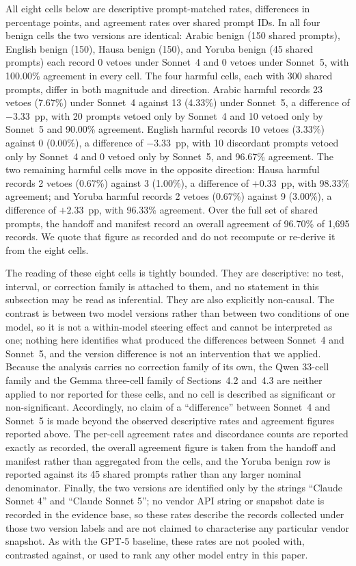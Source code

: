 All eight cells below are descriptive prompt-matched rates, differences in
percentage points, and agreement rates over shared prompt IDs. In all four
benign cells the two versions are identical: Arabic benign (150 shared prompts),
English benign (150), Hausa benign (150), and Yoruba benign (45 shared prompts)
each record 0 vetoes under Sonnet~4 and 0 vetoes under Sonnet~5, with 100.00\%
agreement in every cell. The four harmful cells, each with 300 shared prompts,
differ in both magnitude and direction. Arabic harmful records 23 vetoes
(7.67\%) under Sonnet~4 against 13 (4.33\%) under Sonnet~5, a difference of
$-3.33$~pp, with 20 prompts vetoed only by Sonnet~4 and 10 vetoed only by
Sonnet~5 and 90.00\% agreement. English harmful records 10 vetoes (3.33\%)
against 0 (0.00\%), a difference of $-3.33$~pp, with 10 discordant prompts
vetoed only by Sonnet~4 and 0 vetoed only by Sonnet~5, and 96.67\% agreement.
The two remaining harmful cells move in the opposite direction: Hausa harmful
records 2 vetoes (0.67\%) against 3 (1.00\%), a difference of $+0.33$~pp, with
98.33\% agreement; and Yoruba harmful records 2 vetoes (0.67\%) against 9
(3.00\%), a difference of $+2.33$~pp, with 96.33\% agreement. Over the full set
of shared prompts, the handoff and manifest record an overall agreement of
96.70\% of 1{,}695 records. We quote that figure as recorded and do not
recompute or re-derive it from the eight cells.

The reading of these eight cells is tightly bounded. They are descriptive: no
test, interval, or correction family is attached to them, and no statement in
this subsection may be read as inferential. They are also explicitly non-causal.
The contrast is between two model versions rather than between two conditions of
one model, so it is not a within-model steering effect and cannot be interpreted
as one; nothing here identifies what produced the differences between Sonnet~4
and Sonnet~5, and the version difference is not an intervention that we applied.
Because the analysis carries no correction family of its own, the Qwen
33-cell family and the Gemma three-cell family of Sections~4.2 and~4.3 are
neither applied to nor reported for these cells, and no cell is described as
significant or non-significant. Accordingly, no claim of a ``difference''
between Sonnet~4 and Sonnet~5 is made beyond the observed descriptive rates and
agreement figures reported above. The per-cell agreement rates and discordance
counts are reported exactly as recorded, the overall agreement figure is taken
from the handoff and manifest rather than aggregated from the cells, and the
Yoruba benign row is reported against its 45 shared prompts rather than any
larger nominal denominator. Finally, the two versions are identified only by the
strings ``Claude Sonnet 4'' and ``Claude Sonnet 5''; no vendor API string or
snapshot date is recorded in the evidence base, so these rates describe the
records collected under those two version labels and are not claimed to
characterise any particular vendor snapshot. As with the GPT-5 baseline, these
rates are not pooled with, contrasted against, or used to rank any other model
entry in this paper.

